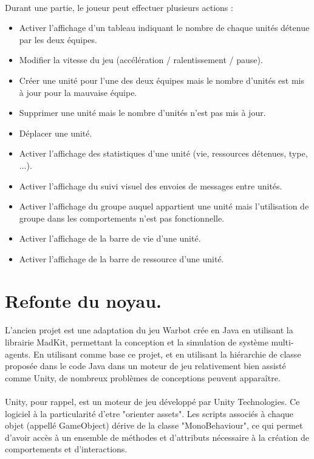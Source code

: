 \documentclass{report}
\begin{document}
\paragraph{}Durant une partie, le joueur peut effectuer plusieurs actions :
\begin{itemize}
\item Activer l'affichage d'un tableau indiquant le nombre de chaque unités détenue par les deux équipes.
\item Modifier la vitesse du jeu (accélération / ralentissement / pause).
\item Créer une unité pour l'une des deux équipes mais le nombre d'unités est mis à jour pour la mauvaise équipe.
\item Supprimer une unité mais le nombre d'unités n'est pas mis à jour.
\item Déplacer une unité.
\item Activer l'affichage des statistiques d'une unité (vie, ressources détenues, type, ...).
\item Activer l'affichage du suivi visuel des envoies de messages entre unités.
\item Activer l'affichage du groupe auquel appartient une unité mais l'utilisation de groupe dans les comportements n'est pas fonctionnelle.
\item Activer l'affichage de la barre de vie d'une unité.
\item Activer l'affichage de la barre de ressource d'une unité.
\end{itemize}

\section{Refonte du noyau.}
\paragraph{}L'ancien projet est une adaptation du jeu Warbot crée en Java en utilisant la librairie MadKit, permettant la conception et la simulation de système multi-agents. En utilisant comme base ce projet, et en utilisant la hiérarchie de classe proposée dans le code Java dans un moteur de jeu relativement bien assisté comme Unity, de nombreux problèmes de conceptions peuvent apparaître.
\paragraph{}Unity, pour rappel, est un moteur de jeu développé par Unity Technologies. Ce logiciel à la particularité d'etre "orienter assets". Les scripts associés à chaque objet (appellé GameObject) dérive de la classe "MonoBehaviour", ce qui permet d'avoir accès à un ensemble de méthodes et d'attributs nécessaire à la création de comportements et d'interactions.
\end{document}
